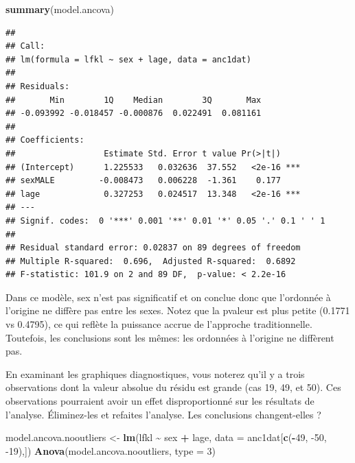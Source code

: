 \documentclass[
  12pt,
]{book}
\makeatletter
\newenvironment{Shaded}{\begin{snugshade}}{\end{snugshade}}
\newcommand{\DataTypeTok}[1]{\textcolor[rgb]{0.13,0.29,0.53}{#1}}
\newcommand{\DecValTok}[1]{\textcolor[rgb]{0.00,0.00,0.81}{#1}}
\newcommand{\KeywordTok}[1]{\textcolor[rgb]{0.13,0.29,0.53}{\textbf{#1}}}
\newcommand{\NormalTok}[1]{#1}
\newcommand{\OperatorTok}[1]{\textcolor[rgb]{0.81,0.36,0.00}{\textbf{#1}}}
\newcommand{\StringTok}[1]{\textcolor[rgb]{0.31,0.60,0.02}{#1}}
\newenvironment{kframe}{%
\medskip{}
\setlength{\fboxsep}{.8em}
\def\at@end@of@kframe{}%
\ifinner\ifhmode%
 \def\at@end@of@kframe{\end{minipage}}%
 \begin{minipage}{\columnwidth}%
\fi\fi%
\def\FrameCommand##1{\hskip\@totalleftmargin \hskip-\fboxsep
\colorbox{incolor}{##1}\hskip-\fboxsep
    \hskip-\linewidth \hskip-\@totalleftmargin \hskip\columnwidth}%
\MakeFramed {\advance\hsize-\width
  \@totalleftmargin\z@ \linewidth\hsize
  \@setminipage}}%
{\par\unskip\endMakeFramed%
\at@end@of@kframe}
\newenvironment{rmdblock}[1]
 {
 \begin{itemize}
 \renewcommand{\labelitemi}{
   \raisebox{-.7\height}[0pt][0pt]{
     {\setkeys{Gin}{width=3em,keepaspectratio}\texttt{[image: images/\#1]}}
   }
 }
 \begin{kframe}
 \setlength{\fboxsep}{1em}
 \item
 }
 {
 \end{kframe}
 \end{itemize}
 }
\newenvironment{rmdcode}
  {\begin{rmdblock}{screen}}
  {\end{rmdblock}}
\makeatother
\begin{document}
\begin{Shaded}
\begin{Highlighting}[]
\KeywordTok{summary}\NormalTok{(model.ancova)}
\end{Highlighting}
\end{Shaded}

\begin{verbatim}
## 
## Call:
## lm(formula = lfkl ~ sex + lage, data = anc1dat)
## 
## Residuals:
##       Min        1Q    Median        3Q       Max 
## -0.093992 -0.018457 -0.000876  0.022491  0.081161 
## 
## Coefficients:
##                  Estimate Std. Error t value Pr(>|t|)    
## (Intercept)      1.225533   0.032636  37.552   <2e-16 ***
## sexMALE         -0.008473   0.006228  -1.361    0.177    
## lage             0.327253   0.024517  13.348   <2e-16 ***
## ---
## Signif. codes:  0 '***' 0.001 '**' 0.01 '*' 0.05 '.' 0.1 ' ' 1
## 
## Residual standard error: 0.02837 on 89 degrees of freedom
## Multiple R-squared:  0.696,  Adjusted R-squared:  0.6892 
## F-statistic: 101.9 on 2 and 89 DF,  p-value: < 2.2e-16
\end{verbatim}

Dans ce modèle, sex n'est pas significatif et on conclue donc que l'ordonnée à l'origine ne diffère pas entre les sexes. Notez que la pvaleur est plus petite (0.1771 vs 0.4795), ce qui reflète la puissance accrue de l'approche traditionnelle. Toutefois, les conclusions sont les mêmes: les ordonnées à l'origine ne diffèrent pas.

\begin{rmdcode}
En examinant les graphiques diagnostiques, vous noterez qu'il y a trois observations dont la valeur absolue du résidu est grande (cas 19, 49, et 50). Ces observations pourraient avoir un effet disproportionné sur les résultats de l'analyse. Éliminez-les et refaites l'analyse. Les conclusions changent-elles ?
\end{rmdcode}

\begin{Shaded}
\begin{Highlighting}[]
\NormalTok{model.ancova.nooutliers \textless{}{-}}\StringTok{ }\KeywordTok{lm}\NormalTok{(lfkl }\OperatorTok{\textasciitilde{}}\StringTok{ }\NormalTok{sex }\OperatorTok{+}\StringTok{ }\NormalTok{lage, }\DataTypeTok{data =}\NormalTok{ anc1dat[}\KeywordTok{c}\NormalTok{(}\OperatorTok{{-}}\DecValTok{49}\NormalTok{, }\DecValTok{{-}50}\NormalTok{, }\DecValTok{{-}19}\NormalTok{),])}
\KeywordTok{Anova}\NormalTok{(model.ancova.nooutliers, }\DataTypeTok{type =} \DecValTok{3}\NormalTok{)}
\end{Highlighting}
\end{Shaded}
\end{document}

